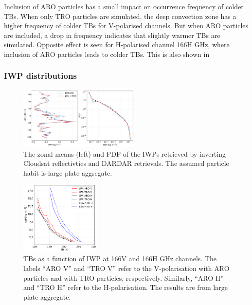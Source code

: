 \documentclass[amt, manuscript]{copernicus}
\begin{document}
Inclusion of ARO particles has a small impact on occurrence frequency of colder TBs. When only TRO particles are simulated, the deep convection zone has a higher frequency of colder TBs for V-polarised channels. But when ARO particles are included, a drop in frequency indicates that slightly warmer TBs are simulated. Opposite effect is seen for H-polarised channel 166H\,\,GHz, where inclusion of ARO particles leads to colder TBs. This is also shown in 




\subsubsection{IWP distributions}
%
\begin{figure}[t]
	\includegraphics[width=6cm]{Figures/PDF_IWP_DARDAR.pdf}
	\caption{The zonal means (left) and  PDF of  the IWPs retrieved by inverting Cloudsat reflectivties and  DARDAR retrievals. The assumed particle habit is large plate aggregate.}
	\label{fig:IWP_DARDAR}
\end{figure}
\begin{figure}[t]
	\includegraphics[width=4cm]{Figures/TB_IWP.pdf}
	\caption{TBs as a function of IWP at 166V and 166H\,\,GHz channels. The labels ``ARO V'' and ``TRO V'' refer to the V-polarisation with ARO particles and with TRO particles, respectively. Similarly, ``ARO H'' and ``TRO H'' refer to the H-polarisation. The results are from large plate aggregate.}
	\label{fig:TB_IWP}
\end{figure}
\end{document}
